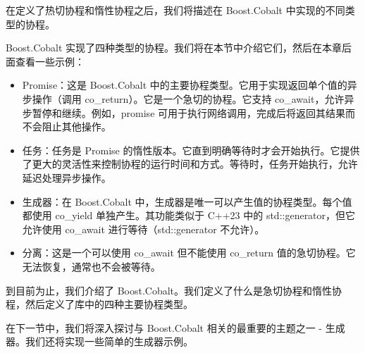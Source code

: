 在定义了热切协程和惰性协程之后，我们将描述在 Boost.Cobalt 中实现的不同类型的协程。


Boost.Cobalt 实现了四种类型的协程。我们将在本节中介绍它们，然后在本章后面查看一些示例：

\begin{itemize}
\item
Promise：这是 Boost.Cobalt 中的主要协程类型。它用于实现返回单个值的异步操作（调用 co\_return）。它是一个急切的协程。它支持 co\_await，允许异步暂停和继续。例如，promise 可用于执行网络调用，完成后将返回其结果而不会阻止其他操作。

\item
任务：任务是 Promise 的惰性版本。它直到明确等待时才会开始执行。它提供了更大的灵活性来控制协程的运行时间和方式。等待时，任务开始执行，允许延迟处理异步操作。

\item
生成器：在 Boost.Cobalt 中，生成器是唯一可以产生值的协程类型。每个值都使用 co\_yield 单独产生。其功能类似于 C++23 中的 std::generator，但它允许使用 co\_await 进行等待（std::generator 不允许）。

\item
分离：这是一个可以使用 co\_await 但不能使用 co\_return 值的急切协程。它无法恢复，通常也不会被等待。
\end{itemize}

到目前为止，我们介绍了 Boost.Cobalt。我们定义了什么是急切协程和惰性协程，然后定义了库中的四种主要协程类型。

在下一节中，我们将深入探讨与 Boost.Cobalt 相关的最重要的主题之一 - 生成器。我们还将实现一些简单的生成器示例。














































